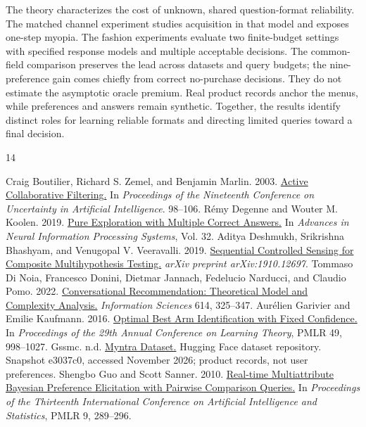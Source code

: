 \documentclass[sigconf,anonymous,review]{acmart}
\begin{document}
The theory characterizes the cost of unknown, shared question-format reliability. The matched channel experiment studies acquisition in that model and exposes one-step myopia. The fashion experiments evaluate two finite-budget settings with specified response models and multiple acceptable decisions. The common-field comparison preserves the lead across datasets and query budgets; the nine-preference gain comes chiefly from correct no-purchase decisions. They do not estimate the asymptotic oracle premium. Real product records anchor the menus, while preferences and answers remain synthetic. Together, the results identify distinct roles for learning reliable formats and directing limited queries toward a final decision.
\begin{thebibliography}{14}

 Craig Boutilier, Richard S. Zemel, and Benjamin Marlin. 2003. \href{https://www.cs.toronto.edu/kr/papers/acf.pdf}{Active Collaborative Filtering.} In \emph{Proceedings of the Nineteenth Conference on Uncertainty in Artificial Intelligence}. 98--106. 
 R\'emy Degenne and Wouter M. Koolen. 2019. \href{https://papers.neurips.cc/paper_files/paper/2019/hash/60cb558c40e4f18479664069d9642d5a-Abstract.html}{Pure Exploration with Multiple Correct Answers.} In \emph{Advances in Neural Information Processing Systems}, Vol. 32. 
 Aditya Deshmukh, Srikrishna Bhashyam, and Venugopal V. Veeravalli. 2019. \href{https://arxiv.org/abs/1910.12697}{Sequential Controlled Sensing for Composite Multihypothesis Testing.} \emph{arXiv preprint arXiv:1910.12697}. 
 Tommaso Di Noia, Francesco Donini, Dietmar Jannach, Fedelucio Narducci, and Claudio Pomo. 2022. \href{https://doi.org/10.1016/j.ins.2022.07.169}{Conversational Recommendation: Theoretical Model and Complexity Analysis.} \emph{Information Sciences} 614, 325--347. 
 Aur\'elien Garivier and Emilie Kaufmann. 2016. \href{https://proceedings.mlr.press/v49/garivier16a.html}{Optimal Best Arm Identification with Fixed Confidence.} In \emph{Proceedings of the 29th Annual Conference on Learning Theory}, PMLR 49, 998--1027. 
 Gssmc. n.d. \href{https://huggingface.co/datasets/Gssmc/myntra_dataset}{Myntra Dataset.} Hugging Face dataset repository.  Snapshot e3037c0, accessed November 2026; product records, not user preferences.
 Shengbo Guo and Scott Sanner. 2010. \href{https://proceedings.mlr.press/v9/guo10b.html}{Real-time Multiattribute Bayesian Preference Elicitation with Pairwise Comparison Queries.} In \emph{Proceedings of the Thirteenth International Conference on Artificial Intelligence and Statistics}, PMLR 9, 289--296. 

\end{thebibliography}
\end{document}
